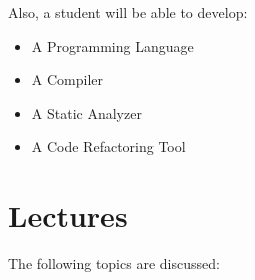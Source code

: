 \documentclass[nobrand,anonymous,nodate,nosecurity]{huawei}
\begin{document}
Also, a student will be able to develop:

\begin{itemize}
\item A Programming Language
\item A Compiler
\item A Static Analyzer
\item A Code Refactoring Tool
\end{itemize}

\newpage
\section*{Lectures}

The following topics are discussed:

\end{document}
